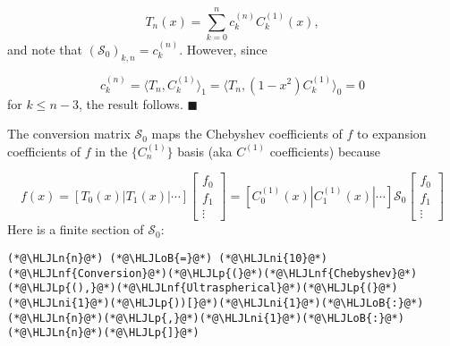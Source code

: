 \documentclass[12pt,a4paper]{article}
\newcommand{\HLJLn}[1]{#1}
\newcommand{\HLJLnf}[1]{\textcolor[RGB]{66,102,213}{#1}}
\newcommand{\HLJLni}[1]{\textcolor[RGB]{59,151,46}{#1}}
\newcommand{\HLJLoB}[1]{\textcolor[RGB]{102,102,102}{\textbf{#1}}}
\newcommand{\HLJLp}[1]{#1}
\begin{document}
\[
T_n(x) = \sum_{k=0}^{n} c_k^{(n)} C_k^{(1)}(x),
\]
and note that $\left(\mathcal{S}_0\right)_{k,n} = c_k^{(n)}$. However, since

\[
c_k^{(n)} = \langle  T_n,  C^{(1)}_k \rangle_{1} = \langle  T_n,  (1-x^2)C^{(1)}_k \rangle_{0} = 0
\]
for $k \leq n-3$, the result follows.  $\blacksquare$

The conversion matrix $\mathcal{S}_0$ maps the Chebyshev coefficients of $f$ to expansion coefficients of $f$ in the $\{C_n^{(1)}\}$ basis (aka $C^{(1)}$ coefficients) because

\[
f(x) = \left[ T_0(x) | T_1(x) | \cdots  \right]
\begin{bmatrix}
f_0 \\
f_1 \\
\vdots
\end{bmatrix}  =  \left[ C^{(1)}_0(x) | C^{(1)}_1(x) | \cdots  \right]\mathcal{S}_0\begin{bmatrix}
f_0 \\
f_1 \\
\vdots
\end{bmatrix}
\]
Here is a finite section of $\mathcal{S}_0$:


\begin{lstlisting}
(*@\HLJLn{n}@*) (*@\HLJLoB{=}@*) (*@\HLJLni{10}@*)
(*@\HLJLnf{Conversion}@*)(*@\HLJLp{(}@*)(*@\HLJLnf{Chebyshev}@*)(*@\HLJLp{(),}@*)(*@\HLJLnf{Ultraspherical}@*)(*@\HLJLp{(}@*)(*@\HLJLni{1}@*)(*@\HLJLp{))[}@*)(*@\HLJLni{1}@*)(*@\HLJLoB{:}@*)(*@\HLJLn{n}@*)(*@\HLJLp{,}@*)(*@\HLJLni{1}@*)(*@\HLJLoB{:}@*)(*@\HLJLn{n}@*)(*@\HLJLp{]}@*)
\end{lstlisting}
\end{document}
